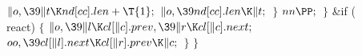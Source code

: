 ${}\|o,\39\|t\K\\{nd}[\\{cc}].\\{len}+\T{1};{}$\6
${}\|o,\39\\{nd}[\\{cc}].\\{len}\K\|t;{}$\6
\4${}\}{}$\2\6
${}\\{nn}\PP;{}$\6
\4${}\}{}$\2\2\6
\&{if} (\\{react})\5
${}\{{}$\1\6
${}\|o,\39\|l\K\\{cl}[\|c].\\{prev},\39\|r\K\\{cl}[\|c].\\{next};{}$\6
${}\\{oo},\39\\{cl}[\|l].\\{next}\K\\{cl}[\|r].\\{prev}\K\|c;{}$\6
\4${}\}{}$\2\6
\4${}\}{}$\2\par
\fi

